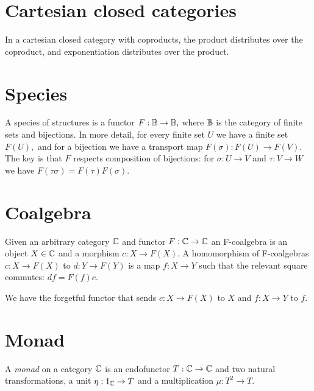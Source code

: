 \documentclass[11pt]{article}
\begin{document}
%
%

\section{Cartesian closed categories}

In a cartesian closed category with coproducts, 
the product distributes over the coproduct, and exponentiation distributes over the product.


\section{Species}

A species of structures \cite{Bergeron1998} is a functor $F:\mathbb B\to\mathbb B,$ 
where $\mathbb B$ is the category of finite sets and bijections.
In more detail, for every finite set $U$ we have a finite set $F(U),$
and for a bijection we have a transport map $F(\sigma):F(U)\to F(V).$
The key is that $F$ respects composition of bijections:
for $\sigma:U\to V$ and $\tau:V\to W$ we have
$F(\tau \sigma) = F(\tau) F(\sigma).$


\section{Coalgebra}

Given an arbitrary category $\mathbb C$ and functor $F:\mathbb C\to \mathbb C$
an F-coalgebra \cite{Jacobs2012}
is an object $X\in \mathbb C$ and a morphism $c:X\to F(X).$
A homomorphism of F-coalgebras $c:X\to F(X)$ to $d:Y\to F(Y)$
is a map $f:X\to Y$ such that the relevant square commutes: $df = F(f)c.$

We have the forgetful functor that sends $c:X\to F(X)$ to $X$ and
$f:X\to Y$ to $f.$

\section{Monad}

A \emph{monad} on a category $\mathbb C$ is an endofunctor $T:\mathbb C\to \mathbb C$
and two natural transformations,
a unit $\eta:1_\mathbb C\to T$ and a multiplication $\mu:T^2\to T.$
\end{document}
